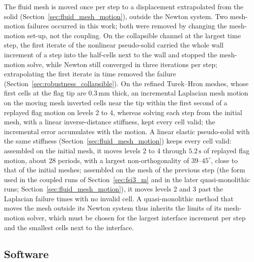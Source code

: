 The fluid mesh is moved once per step to a displacement extrapolated from the solid (Section~\ref{sec:fluid_mesh_motion}), outside the Newton system.
Two mesh-motion failures occurred in this work; both were removed by changing the mesh-motion set-up, not the coupling.
On the collapsible channel at the largest time step, the first iterate of the nonlinear pseudo-solid carried the whole wall increment of a step into the half-cells next to the wall and stopped the mesh-motion solve, while Newton still converged in three iterations per step; extrapolating the first iterate in time removed the failure (Section~\ref{sec:robustness_collapsible}).
On the refined Turek--Hron meshes, whose first cells at the flag tip are $0.3\,\mathrm{mm}$ thick, an incremental Laplacian mesh motion on the moving mesh inverted cells near the tip within the first second of a replayed flag motion on levels 2 to 4, whereas solving each step from the initial mesh, with a linear inverse-distance stiffness, kept every cell valid; the incremental error accumulates with the motion.
A linear elastic pseudo-solid with the same stiffness (Section~\ref{sec:fluid_mesh_motion}) keeps every cell valid: assembled on the initial mesh, it moves levels 2 to 4 through $5.2\,\mathrm{s}$ of replayed flag motion, about 28 periods, with a largest non-orthogonality of $39$--$45^\circ$, close to that of the initial meshes; assembled on the mesh of the previous step (the form used in the coupled runs of Section~\ref{sec:fsi3_m} and in the later quasi-monolithic runs; Section~\ref{sec:fluid_mesh_motion}), it moves levels 2 and 3 past the Laplacian failure times with no invalid cell.
A quasi-monolithic method that moves the mesh outside its Newton system thus inherits the limits of its mesh-motion solver, which must be chosen for the largest interface increment per step and the smallest cells next to the interface.

\subsection{Software}\label{sec:lim_platform}

